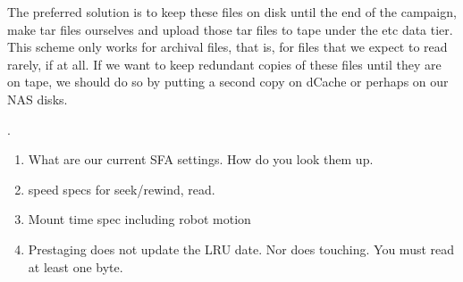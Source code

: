 The preferred solution is to keep these files on disk until the end of the campaign,
make tar files ourselves
and upload those tar files to tape under the etc data tier.
This scheme only works for archival files, that is, for files that we expect to
read rarely, if at all.
If we want to keep redundant copies of these files until they are on tape,
we should do so by putting a second copy on dCache or perhaps on our NAS disks.

.

\begin{enumerate}
  \item What are our current SFA settings.  How do you look them up.
  \item speed specs for seek/rewind, read.
  \item Mount time spec including robot motion
  \item Prestaging does not update the LRU date.  Nor does touching.  You must read at least one byte.
\end{enumerate}
